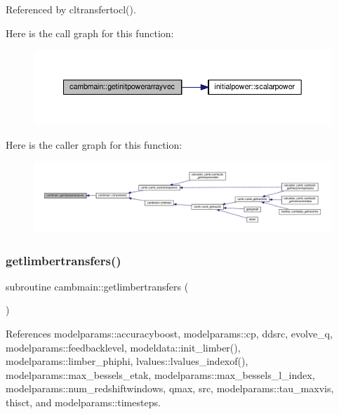 Referenced by cltransfertocl().

Here is the call graph for this function\+:
\nopagebreak
\begin{figure}[H]
\begin{center}
\leavevmode
\includegraphics[width=350pt]{namespacecambmain_a5fb4d38dca7390cd662572152b12f7d0_cgraph}
\end{center}
\end{figure}
Here is the caller graph for this function\+:
\nopagebreak
\begin{figure}[H]
\begin{center}
\leavevmode
\includegraphics[width=350pt]{namespacecambmain_a5fb4d38dca7390cd662572152b12f7d0_icgraph}
\end{center}
\end{figure}
\mbox{\label{namespacecambmain_ae71666c61f08659e1870539ab6230f02}} 
\subsubsection{\texorpdfstring{getlimbertransfers()}{getlimbertransfers()}}
{\footnotesize\ttfamily subroutine cambmain\+::getlimbertransfers (\begin{DoxyParamCaption}{ }\end{DoxyParamCaption})\hspace{0.3cm}{\ttfamily [private]}}



References modelparams\+::accuracyboost, modelparams\+::cp, ddsrc, evolve\+\_\+q, modelparams\+::feedbacklevel, modeldata\+::init\+\_\+limber(), modelparams\+::limber\+\_\+phiphi, lvalues\+::lvalues\+\_\+indexof(), modelparams\+::max\+\_\+bessels\+\_\+etak, modelparams\+::max\+\_\+bessels\+\_\+l\+\_\+index, modelparams\+::num\+\_\+redshiftwindows, qmax, src, modelparams\+::tau\+\_\+maxvis, thisct, and modelparams\+::timesteps.



